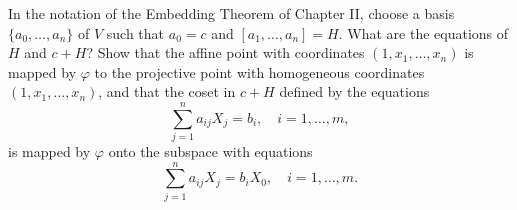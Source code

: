 In the notation of the Embedding Theorem of Chapter II, choose a basis $\{a_0, \ldots, a_n\}$ of $V$ such that $a_0 = c$ and $[a_1, \ldots, a_n] = H$. What are the equations of $H$ and $c+H$? Show that the affine point with coordinates $(1, x_1, \ldots, x_n)$ is mapped by $\varphi$ to the projective point with homogeneous coordinates $(1, x_1, \ldots, x_n)$, and that the coset in $c+H$ defined by the equations
$$\sum_{j=1}^{n} a_{ij} X_j = b_i, \quad i = 1, \ldots, m,$$
is mapped by $\varphi$ onto the subspace with equations
$$\sum_{j=1}^{n} a_{ij} X_j = b_i X_0, \quad i = 1, \ldots, m.$$
